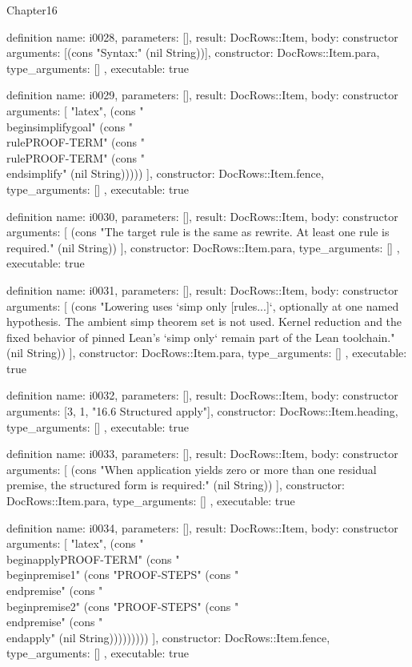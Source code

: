 \begin{lexlean}{Chapter16}
\begin{semanticmodule}
definition{
  name: i0028,
  parameters: [],
  result: DocRows::Item,
  body: constructor{
    arguments: [(cons "Syntax:" (nil String))],
    constructor: DocRows::Item.para,
    type_arguments: []
  },
  executable: true
}

definition{
  name: i0029,
  parameters: [],
  result: DocRows::Item,
  body: constructor{
    arguments: [
      "latex",
      (cons "\\begin{simplify}{goal}" (cons "\\rule{PROOF-TERM}" (cons "\\rule{PROOF-TERM}" (cons "\\end{simplify}" (nil String)))))
    ],
    constructor: DocRows::Item.fence,
    type_arguments: []
  },
  executable: true
}

definition{
  name: i0030,
  parameters: [],
  result: DocRows::Item,
  body: constructor{
    arguments: [
      (cons "The target rule is the same as rewrite. At least one rule is required." (nil String))
    ],
    constructor: DocRows::Item.para,
    type_arguments: []
  },
  executable: true
}

definition{
  name: i0031,
  parameters: [],
  result: DocRows::Item,
  body: constructor{
    arguments: [
      (cons "Lowering uses `simp only [rules...]`, optionally at one named hypothesis. The ambient simp theorem set is not used. Kernel reduction and the fixed behavior of pinned Lean's `simp only` remain part of the Lean toolchain." (nil String))
    ],
    constructor: DocRows::Item.para,
    type_arguments: []
  },
  executable: true
}

definition{
  name: i0032,
  parameters: [],
  result: DocRows::Item,
  body: constructor{
    arguments: [3, 1, "16.6 Structured apply"],
    constructor: DocRows::Item.heading,
    type_arguments: []
  },
  executable: true
}

definition{
  name: i0033,
  parameters: [],
  result: DocRows::Item,
  body: constructor{
    arguments: [
      (cons "When application yields zero or more than one residual premise, the structured form is required:" (nil String))
    ],
    constructor: DocRows::Item.para,
    type_arguments: []
  },
  executable: true
}

definition{
  name: i0034,
  parameters: [],
  result: DocRows::Item,
  body: constructor{
    arguments: [
      "latex",
      (cons "\\begin{apply}{PROOF-TERM}" (cons "\\begin{premise}{1}" (cons "PROOF-STEPS" (cons "\\end{premise}" (cons "\\begin{premise}{2}" (cons "PROOF-STEPS" (cons "\\end{premise}" (cons "\\end{apply}" (nil String)))))))))
    ],
    constructor: DocRows::Item.fence,
    type_arguments: []
  },
  executable: true
}


\end{semanticmodule}
\end{lexlean}
